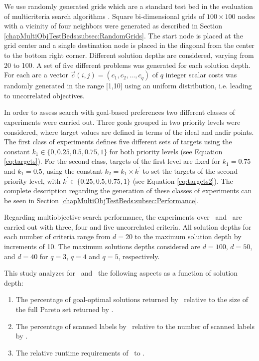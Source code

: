 We use randomly generated grids which are a standard test bed in the evaluation of multicriteria search algorithms \citep{Machuca2012} \citep{Raith2009a}. Square bi-dimensional grids of $100 \times 100$ nodes with a vicinity of four neighbors were generated as described in Section \ref{chapMultiObjTestBeds:subsec:RandomGrids}. The start node is placed at the grid center and a single destination node is placed in the diagonal from the center to the bottom right corner. Different solution depths are considered, varying from 20 to 100. A set of five different problems was generated for each solution depth. For each arc a vector $\vec c(i,j) = (c_1,c_2,...,c_q)$ of $q$ integer scalar costs was randomly generated in the range [1,10] using an uniform distribution, i.e. leading to uncorrelated objectives.

In order to assess search with goal-based preferences two different classes of experiments were carried out. Three goals grouped in two priority levels were considered, where target values are defined in terms of the ideal and nadir points. The first class of experiments defines five different sets of targets using the constant $k_1 \in \{ 0, 0.25, 0.5, 0.75, 1 \}$ for both priority levels (see Equation \ref{eq:targets}). For the second class, targets of the first level are fixed for $k_1=0.75$ and $k_1=0.5$, using the constant $k_2 = k_1 \times k^\prime$ to set the targets of the second priority level, with $k^\prime \in \{ 0.25, 0.5, 0.75, 1 \}$ (see Equation \ref{eq:targets2}). The complete description regarding the generation of these classes of experiments can be seen in Section \ref{chapMultiObjTestBeds:subsec:Performance}.

Regarding multiobjective search performance, the experiments over \namoa \ and \namoate \ are carried out with three, four and five uncorrelated criteria. All solution depths for each number of criteria range from $d=20$ to the maximum solution depth by increments of 10. The maximum solutions depths considered are $d=100$, $d=50$, and $d=40$ for $q=3$, $q=4$ and $q=5$, respectively. 

This study analyzes for \namoa \ and \lexgo \ the following aspects as a function of solution depth:

\begin{enumerate}
    \item The percentage of goal-optimal solutions returned by \lexgo \ relative to the size of the full Pareto set returned by \namoa.
	 \item The percentage of scanned labels by \lexgo \ relative to the number of scanned labels by \namoa.
	 \item The relative runtime requirements of \lexgo \ to \namoa.
\end{enumerate}  

